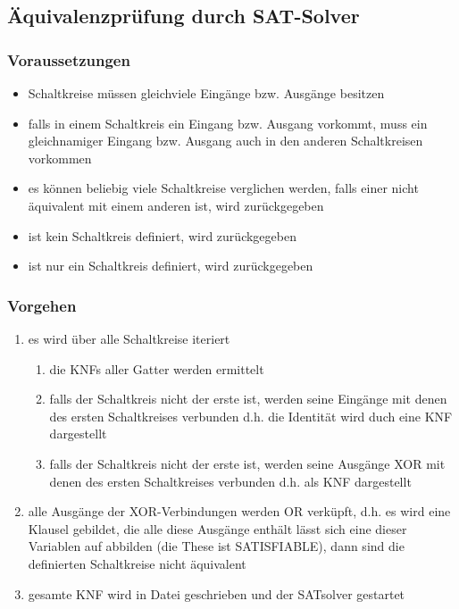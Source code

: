 \subsection{Äquivalenzprüfung durch SAT-Solver}

\subsubsection{Voraussetzungen}
\begin{itemize}
	\item Schaltkreise müssen gleichviele Eingänge bzw. Ausgänge besitzen
	\item falls in einem Schaltkreis ein Eingang bzw. Ausgang vorkommt, muss ein gleichnamiger Eingang bzw. Ausgang auch in den anderen Schaltkreisen vorkommen
	\item es können beliebig viele Schaltkreise verglichen werden, falls einer nicht äquivalent mit einem anderen ist, wird  zurückgegeben
	\item ist kein Schaltkreis definiert, wird  zurückgegeben
	\item ist nur ein Schaltkreis definiert, wird  zurückgegeben

\end{itemize}


\subsubsection{Vorgehen}
\begin{enumerate}
	\item es wird über alle Schaltkreise iteriert
	
	\begin{enumerate}
		\item die KNFs aller Gatter werden ermittelt
		\item falls der Schaltkreis nicht der erste ist, werden seine Eingänge mit denen des ersten Schaltkreises verbunden d.h. die Identität wird duch eine KNF dargestellt
		\item falls der Schaltkreis nicht der erste ist, werden seine Ausgänge XOR mit denen des ersten Schaltkreises verbunden d.h. als KNF dargestellt
	\end{enumerate}
	
	\item alle Ausgänge der XOR-Verbindungen werden OR verküpft, d.h. es wird eine Klausel gebildet, die alle diese Ausgänge enthält
	\subitem lässt sich eine dieser Variablen auf  abbilden (die These ist SATISFIABLE), dann sind die definierten Schaltkreise nicht äquivalent 
	\item gesamte KNF wird in Datei geschrieben und der SATsolver gestartet
\end{enumerate}


